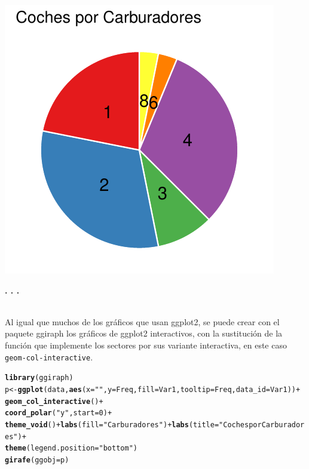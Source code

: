 \documentclass{article}\usepackage[]{graphicx}\usepackage[]{color}
\makeatletter
\def\maxwidth{ %
  \ifdim\Gin@nat@width>\linewidth
    \linewidth
  \else
    \Gin@nat@width
  \fi
}
\newcommand{\hlnum}[1]{\textcolor[rgb]{0.686,0.059,0.569}{#1}}%
\newcommand{\hlstr}[1]{\textcolor[rgb]{0.192,0.494,0.8}{#1}}%
\newcommand{\hlopt}[1]{\textcolor[rgb]{0,0,0}{#1}}%
\newcommand{\hlstd}[1]{\textcolor[rgb]{0.345,0.345,0.345}{#1}}%
\newcommand{\hlkwb}[1]{\textcolor[rgb]{0.69,0.353,0.396}{#1}}%
\newcommand{\hlkwc}[1]{\textcolor[rgb]{0.333,0.667,0.333}{#1}}%
\newcommand{\hlkwd}[1]{\textcolor[rgb]{0.737,0.353,0.396}{\textbf{#1}}}%
\newenvironment{kframe}{%
 \def\at@end@of@kframe{}%
 \ifinner\ifhmode%
  \def\at@end@of@kframe{\end{minipage}}%
  \begin{minipage}{\columnwidth}%
 \fi\fi%
 \def\FrameCommand##1{\hskip\@totalleftmargin \hskip-\fboxsep
 \colorbox{shadecolor}{##1}\hskip-\fboxsep
     \hskip-\linewidth \hskip-\@totalleftmargin \hskip\columnwidth}%
 \MakeFramed {\advance\hsize-\width
   \@totalleftmargin\z@ \linewidth\hsize
   \@setminipage}}%
 {\par\unskip\endMakeFramed%
 \at@end@of@kframe}
\newenvironment{knitrout}{}{} %
\makeatother
\begin{document}
\begin{knitrout}
\color{fgcolor}

{\centering \includegraphics[width=\maxwidth]{figure/plot_ggplot_pie-1} 

}



\end{knitrout}
\begin{center}
\textbf{. . .}
\end{center}
~\\
Al igual que muchos de los gr\'aficos que usan ggplot2, se puede crear con el paquete ggiraph %
los gr\'aficos de ggplot2 interactivos, con la sustituci\'on de la funci\'on que implemente los sectores por sus variante interactiva, en este caso \texttt{geom-col-interactive}.
\begin{knitrout}
\color{fgcolor}\begin{kframe}
\begin{alltt}
\hlkwd{library}\hlstd{(ggiraph)}
\hlstd{p} \hlkwb{<-} \hlkwd{ggplot}\hlstd{(data,} \hlkwd{aes}\hlstd{(}\hlkwc{x}\hlstd{=}\hlstr{""}\hlstd{,} \hlkwc{y}\hlstd{=Freq,} \hlkwc{fill}\hlstd{=Var1,} \hlkwc{tooltip} \hlstd{= Freq,} \hlkwc{data_id} \hlstd{= Var1))} \hlopt{+}
  \hlkwd{geom_col_interactive}\hlstd{()} \hlopt{+}
  \hlkwd{coord_polar}\hlstd{(}\hlstr{"y"}\hlstd{,} \hlkwc{start}\hlstd{=}\hlnum{0}\hlstd{)} \hlopt{+}
  \hlkwd{theme_void}\hlstd{()} \hlopt{+} \hlkwd{labs}\hlstd{(}\hlkwc{fill}\hlstd{=}\hlstr{"Carburadores"}\hlstd{)}\hlopt{+}\hlkwd{labs}\hlstd{(}\hlkwc{title}\hlstd{=}\hlstr{"Coches por Carburadores"}\hlstd{)}\hlopt{+}
  \hlkwd{theme}\hlstd{(}\hlkwc{legend.position} \hlstd{=} \hlstr{"bottom"}\hlstd{)}
\hlkwd{girafe}\hlstd{(}\hlkwc{ggobj} \hlstd{= p)}
\end{alltt}
\end{kframe}
\end{knitrout}
\end{document}
